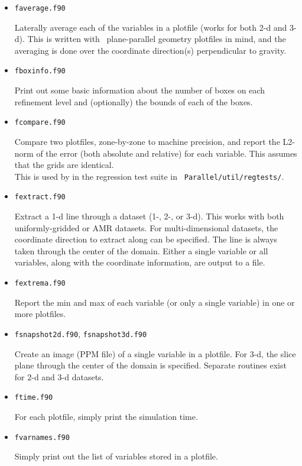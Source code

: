 \begin{itemize}

\item {\tt faverage.f90}

  Laterally average each of the variables in a plotfile (works for
  both 2-d and 3-d).  This is written with \maestro\
  plane-parallel geometry plotfiles in mind, and the averaging is done
  over the coordinate direction(s) perpendicular to gravity.


\item {\tt fboxinfo.f90}

  Print out some basic information about the number of boxes on each
  refinement level and (optionally) the bounds of each of the boxes.

\item {\tt fcompare.f90}

  Compare two plotfiles, zone-by-zone to machine precision, and report
  the L2-norm of the error (both absolute and relative) for each
  variable.  This assumes that the grids are identical. \\[-3mm]

  This is used by in the regression test suite in {\tt
  Parallel/util/regtests/}.


\item {\tt fextract.f90}

  Extract a 1-d line through a dataset (1-, 2-, or 3-d).  This works
  with both uniformly-gridded or AMR datasets.  For multi-dimensional
  datasets, the coordinate direction to extract along can be specified.
  The line is always taken through the center of the domain.  Either
  a single variable or all variables, along with the coordinate 
  information, are output to a file.
  

\item {\tt fextrema.f90}

  Report the min and max of each variable (or only a single variable)
  in one or more plotfiles.


\item {\tt fsnapshot2d.f90}, {\tt fsnapshot3d.f90}

  Create an image (PPM file) of a single variable in a plotfile.  For
  3-d, the slice plane through the center of the domain is specified.
  Separate routines exist for 2-d and 3-d datasets.
  

\item {\tt ftime.f90}
 
  For each plotfile, simply print the simulation time.


\item {\tt fvarnames.f90}

  Simply print out the list of variables stored in a plotfile.


\end{itemize}

